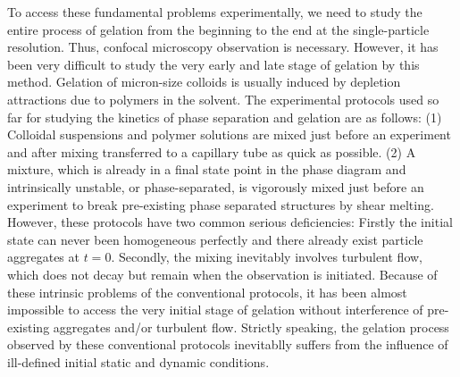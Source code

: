 \documentclass[preprint,footinbib,amsmath,amssymb]{revtex4}
\begin{document}
To access these fundamental problems experimentally, we need to study the entire process of gelation from the beginning to the end at the single-particle resolution. 
Thus, confocal microscopy observation is necessary. However, it has been very difficult to study the very early and late stage of gelation by this method. 
Gelation of micron-size colloids is usually induced by depletion attractions due to polymers in the solvent. 
The experimental protocols used so far for studying the kinetics of phase separation and gelation are as follows: (1) Colloidal suspensions and polymer solutions are mixed just before an experiment and after mixing transferred to a capillary tube as quick as possible. 
(2) A mixture, which is already in a final state point in the phase diagram and intrinsically unstable, or phase-separated, is vigorously mixed just before an experiment to break pre-existing phase separated structures by shear melting. 
However, these protocols have two common serious deficiencies: Firstly the initial state can never been homogeneous perfectly and there already exist particle aggregates at $t=0$. Secondly, the mixing inevitably involves 
turbulent flow, which does not decay but remain when the observation is initiated. 
Because of these intrinsic problems of the conventional protocols, it has been almost impossible to access the very initial stage of gelation without interference of pre-existing aggregates and/or turbulent flow.  
Strictly speaking, the gelation process observed by these conventional protocols inevitablly suffers from the influence of ill-defined initial static and dynamic conditions. 
\end{document}
